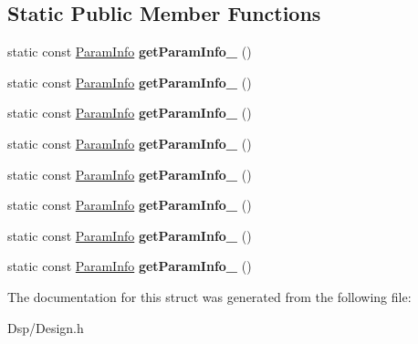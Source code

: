 \subsection*{Static Public Member Functions}
\begin{DoxyCompactItemize}
\item 
\hypertarget{structDsp_1_1DesignBase_a8e70c31f28a0f31ed0aabdd4ece19f5a}{static const \hyperlink{classDsp_1_1ParamInfo}{Param\-Info} {\bfseries get\-Param\-Info\-\_} ()}\label{structDsp_1_1DesignBase_a8e70c31f28a0f31ed0aabdd4ece19f5a}

\item 
\hypertarget{structDsp_1_1DesignBase_a8d5cb6580d9717f7c2385ebc07019014}{static const \hyperlink{classDsp_1_1ParamInfo}{Param\-Info} {\bfseries get\-Param\-Info\-\_} ()}\label{structDsp_1_1DesignBase_a8d5cb6580d9717f7c2385ebc07019014}

\item 
\hypertarget{structDsp_1_1DesignBase_a5e3e33ff810b5c7ec4f468e83ae321d7}{static const \hyperlink{classDsp_1_1ParamInfo}{Param\-Info} {\bfseries get\-Param\-Info\-\_} ()}\label{structDsp_1_1DesignBase_a5e3e33ff810b5c7ec4f468e83ae321d7}

\item 
\hypertarget{structDsp_1_1DesignBase_a027e47248656fe6ac9a8744311bb717b}{static const \hyperlink{classDsp_1_1ParamInfo}{Param\-Info} {\bfseries get\-Param\-Info\-\_} ()}\label{structDsp_1_1DesignBase_a027e47248656fe6ac9a8744311bb717b}

\item 
\hypertarget{structDsp_1_1DesignBase_a77d81d1aae7eb44d316336a37fdb87e7}{static const \hyperlink{classDsp_1_1ParamInfo}{Param\-Info} {\bfseries get\-Param\-Info\-\_} ()}\label{structDsp_1_1DesignBase_a77d81d1aae7eb44d316336a37fdb87e7}

\item 
\hypertarget{structDsp_1_1DesignBase_ae23329a7dabd5cca5470db153d077546}{static const \hyperlink{classDsp_1_1ParamInfo}{Param\-Info} {\bfseries get\-Param\-Info\-\_} ()}\label{structDsp_1_1DesignBase_ae23329a7dabd5cca5470db153d077546}

\item 
\hypertarget{structDsp_1_1DesignBase_a25b1befe87ce28fbcf0fb55875bb099b}{static const \hyperlink{classDsp_1_1ParamInfo}{Param\-Info} {\bfseries get\-Param\-Info\-\_} ()}\label{structDsp_1_1DesignBase_a25b1befe87ce28fbcf0fb55875bb099b}

\item 
\hypertarget{structDsp_1_1DesignBase_a3d240fa4a6f9c792a88c52e31e875f45}{static const \hyperlink{classDsp_1_1ParamInfo}{Param\-Info} {\bfseries get\-Param\-Info\-\_} ()}\label{structDsp_1_1DesignBase_a3d240fa4a6f9c792a88c52e31e875f45}

\end{DoxyCompactItemize}


The documentation for this struct was generated from the following file\-:\begin{DoxyCompactItemize}
\item 
Dsp/Design.\-h\end{DoxyCompactItemize}
